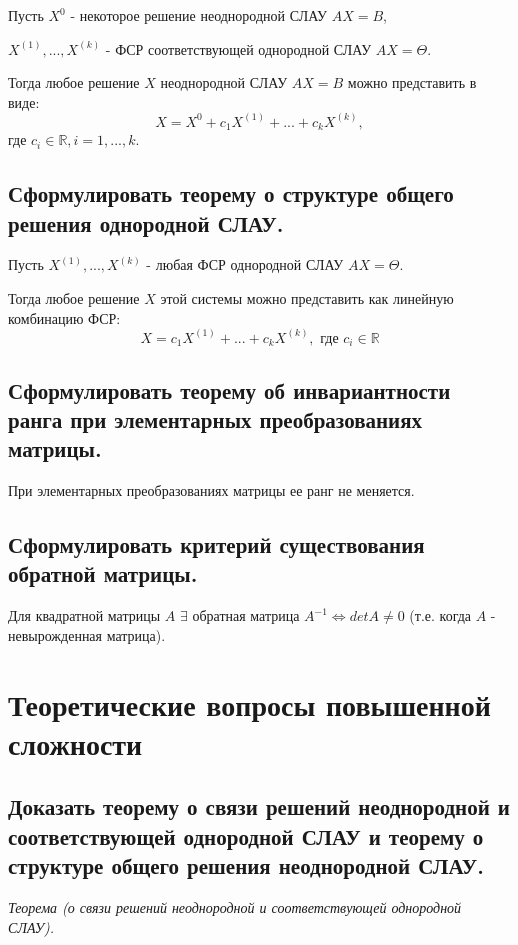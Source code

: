 Пусть $X^0$ - некоторое решение неоднородной СЛАУ $AX = B$, 

$X^{(1)}, ..., X^{(k)}$ - ФСР соответствующей однородной СЛАУ $AX = \Theta.$

Тогда любое решение $X$ неоднородной СЛАУ $AX = B$ можно представить в виде:
$$X = X^0 + c_1X^{(1)}+ ...+ c_kX^{(k)},$$
где $c_i\in\mathbb{R}, i = 1, ..., k$.

\subsection{Сформулировать теорему о структуре общего решения однородной СЛАУ.}

Пусть $X^{(1)}, ..., X^{(k)}$ - любая ФСР однородной СЛАУ $AX = \Theta.$

Тогда любое решение $X$ этой системы можно представить как линейную комбинацию ФСР:$$X = c_1X^{(1)}+ ...+ c_kX^{(k)}, \text{ где } c_i\in\mathbb{R}$$

\subsection{Сформулировать теорему об инвариантности ранга при элементарных преобразованиях матрицы.}

При элементарных преобразованиях матрицы ее ранг не меняется.

\subsection{Сформулировать критерий существования обратной матрицы.}

Для квадратной матрицы $A$ $\exists$ обратная матрица $A^{-1} \iff detA \ne 0$
(т.е. когда $A$ - невырожденная матрица). 

\newpage\section{Теоретические вопросы повышенной сложности}

\subsection{Доказать теорему о связи решений неоднородной и соответствующей однородной СЛАУ и теорему о структуре общего решения неоднородной СЛАУ.}

\textit {Теорема (о связи решений неоднородной и соответствующей однородной СЛАУ).}

\vspace*{15pt}

